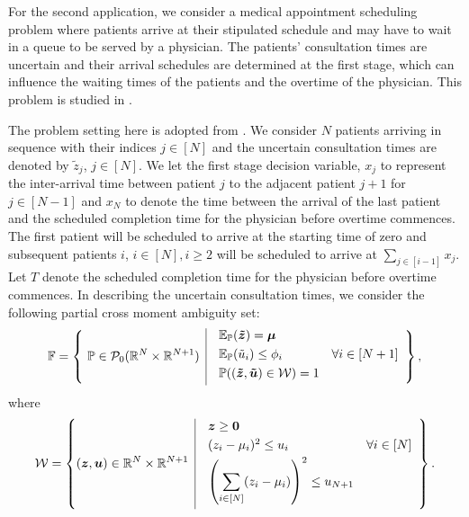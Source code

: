\documentclass[fleqn,orsc,blindrev]{informs4}
\newcommand{\mb}[1]{\mbox{\boldmath \ensuremath{#1}}}
\newcommand{\mbt}[1]{\mb{\tilde{#1}}}
\renewcommand{\Re}{\mathbb{R}}
\begin{document}
		For the second application, we consider a medical appointment scheduling problem where patients arrive at their stipulated schedule and may have to wait in a queue to be served by a physician.  The patients' consultation times are uncertain and their arrival schedules are determined at the first stage, which can influence the waiting times of the patients and the overtime of the physician. This problem is studied in \cite{kltz13, mrz14, bsz17}.
		
		The problem setting here is adopted from \cite{bsz17}. We consider $N$ patients arriving in sequence with their indices $j \in [N]$ and the uncertain consultation times are denoted by $\tilde{z}_j$, $j \in [N]$.
		We let the first stage decision variable, $x_j$ to represent the  inter-arrival time between patient $j$ to the adjacent patient $j+1$ for $j\in [N-1]$ and $x_{N}$ to denote the time between the arrival of the last patient   and the scheduled completion time for the physician before overtime commences. The first patient will be scheduled to arrive at the starting time of zero and  subsequent patients  $i$, $i \in [N], i\geq 2$ will be scheduled to arrive at  $\sum_{j \in[i-1]}x_j$. Let $T$ denote the scheduled completion time for the physician before overtime commences. In describing the uncertain consultation times, we consider the following partial cross moment ambiguity set:
\begin{equation*}
		\mathbb{F} = \left\{ \ \mathbb{P}\in\mathcal{P}_0(\Re^{N}\times \Re^{N+1}) \enskip \vline \enskip
		\begin{array}{ll}
		\mathbb{E}_{\mathbb{P}}(\mbt{z}) = \mb{\mu} \vspace{3pt}\\
		\mathbb{E}_{\mathbb{P}}(\tilde{u}_i) \leq  \phi_i & \forall i \in [N+1] \vspace{3pt}\\
		\mathbb{P}( (\mbt{z}, \mbt{u})\in \mathcal{W}) = 1 \vspace{3pt}
		\end{array}
		\right\},
\end{equation*}
		where
\begin{equation*}
			\label{eq:W3set}
			\mathcal{W} = \left\{ (\mb{z}, \mb{u})\in \Re^{N}\times\Re^{N+1} \enskip \vline \enskip
			\begin{array}{ll}
				\mb{z} \geq \mb{0}  \vspace{3pt}\\
				(z_i-\mu_i)^2 \leq u_i& \forall i \in [N]  \vspace{3pt}\\
				\displaystyle  \left(\sum_{i\in [N]}(z_i - \mu_i)\right)^2 \leq u_{N+1} \vspace{3pt}
			\end{array}
			\right\}.
\end{equation*}
\end{document}
